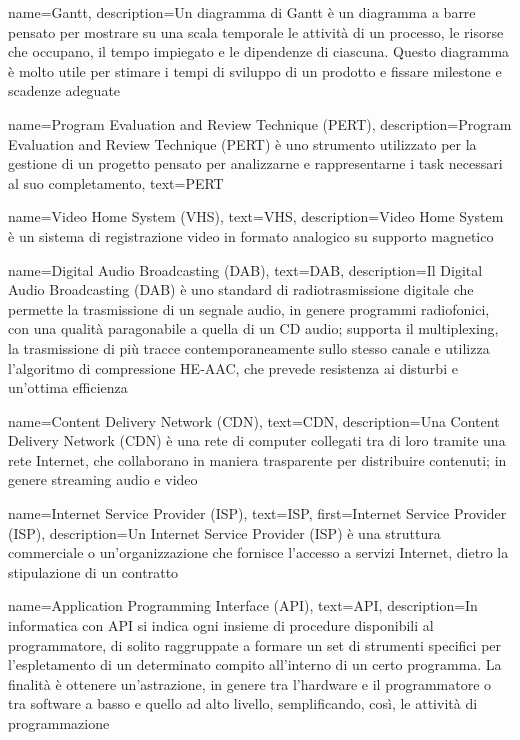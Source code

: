 {
    name={Gantt},
    description={Un diagramma di Gantt è un diagramma a barre pensato per mostrare su una scala temporale le attività di un processo, le risorse che occupano, il tempo impiegato e le dipendenze di ciascuna. Questo diagramma è molto utile per stimare i tempi di sviluppo di un prodotto e fissare milestone e scadenze adeguate}
}

{
    name={Program Evaluation and Review Technique (PERT)},
    description={Program Evaluation and Review Technique (PERT) è uno strumento utilizzato per la gestione di un progetto pensato per analizzarne e rappresentarne i task necessari al suo completamento},
    text={PERT}
}

{
    name={Video Home System (VHS)},
    text={VHS},
    description={Video Home System è un sistema di registrazione video in formato analogico su supporto magnetico}
}

{
    name={Digital Audio Broadcasting (DAB)},
    text={DAB},
    description={Il Digital Audio Broadcasting (DAB) è uno standard di radiotrasmissione digitale che permette la trasmissione di un segnale audio, in genere programmi radiofonici, con una qualità paragonabile a quella di un \gls{CD} audio; supporta il multiplexing, la trasmissione di più tracce contemporaneamente sullo stesso canale e utilizza l'algoritmo di compressione HE-AAC, che prevede resistenza ai disturbi e un'ottima efficienza}
}

{
    name={Content Delivery Network (CDN)},
    text={CDN},
    description={Una Content Delivery Network (CDN) è una rete di computer collegati tra di loro tramite una rete Internet, che collaborano in maniera trasparente per distribuire contenuti; in genere streaming audio e video}
}

{
    name={Internet Service Provider (ISP)},
    text={ISP},
    first={Internet Service Provider (ISP)},
    description={Un Internet Service Provider (ISP) è una struttura commerciale o un'organizzazione che fornisce l'accesso a servizi Internet, dietro la stipulazione di un contratto}
}


{
    name={Application Programming Interface (API)},
    text={API},
    description={In informatica con API si indica ogni insieme di procedure disponibili al programmatore, di solito raggruppate a formare un set
    di strumenti specifici per l’espletamento di un determinato compito all’interno
    di un certo programma. La finalità è ottenere un’astrazione, in genere tra
    l’hardware e il programmatore o tra software a basso e quello ad alto livello,
    semplificando, così, le attività di programmazione}
}

